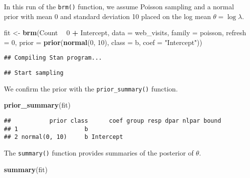 \documentclass[
]{book}
\newenvironment{Shaded}{\begin{snugshade}}{\end{snugshade}}
\newcommand{\DataTypeTok}[1]{\textcolor[rgb]{0.13,0.29,0.53}{#1}}
\newcommand{\DecValTok}[1]{\textcolor[rgb]{0.00,0.00,0.81}{#1}}
\newcommand{\KeywordTok}[1]{\textcolor[rgb]{0.13,0.29,0.53}{\textbf{#1}}}
\newcommand{\NormalTok}[1]{#1}
\newcommand{\OperatorTok}[1]{\textcolor[rgb]{0.81,0.36,0.00}{\textbf{#1}}}
\newcommand{\StringTok}[1]{\textcolor[rgb]{0.31,0.60,0.02}{#1}}
\begin{document}
In this run of the \texttt{brm()} function, we assume Poisson sampling and a normal prior with mean 0 and standard deviation 10 placed on the log mean \(\theta = \log \lambda\).

\begin{Shaded}
\begin{Highlighting}[]
\NormalTok{fit <-}\StringTok{ }\KeywordTok{brm}\NormalTok{(Count }\OperatorTok{~}\StringTok{ }\DecValTok{0} \OperatorTok{+}\StringTok{ }\NormalTok{Intercept, }
            \DataTypeTok{data =}\NormalTok{ web_visits,}
            \DataTypeTok{family =}\NormalTok{ poisson,}
             \DataTypeTok{refresh =} \DecValTok{0}\NormalTok{,}
           \DataTypeTok{prior =} \KeywordTok{prior}\NormalTok{(}\KeywordTok{normal}\NormalTok{(}\DecValTok{0}\NormalTok{, }\DecValTok{10}\NormalTok{), }
                         \DataTypeTok{class =}\NormalTok{ b,}
                         \DataTypeTok{coef =} \StringTok{"Intercept"}\NormalTok{))}
\end{Highlighting}
\end{Shaded}

\begin{verbatim}
## Compiling Stan program...
\end{verbatim}

\begin{verbatim}
## Start sampling
\end{verbatim}

We confirm the prior with the \texttt{prior\_summary()} function.

\begin{Shaded}
\begin{Highlighting}[]
\KeywordTok{prior_summary}\NormalTok{(fit)}
\end{Highlighting}
\end{Shaded}

\begin{verbatim}
##           prior class      coef group resp dpar nlpar bound
## 1                   b                                      
## 2 normal(0, 10)     b Intercept
\end{verbatim}

The \texttt{summary()} function provides summaries of the posterior of \(\theta\).

\begin{Shaded}
\begin{Highlighting}[]
\KeywordTok{summary}\NormalTok{(fit)}
\end{Highlighting}
\end{Shaded}
\end{document}
